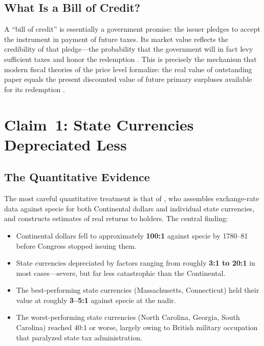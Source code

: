 \documentclass[12pt]{article}
\begin{document}
\subsection{What Is a Bill of Credit?}

A ``bill of credit'' is essentially a government promise: the issuer pledges
to accept the instrument in payment of future taxes.  Its market value
reflects the credibility of that pledge---the probability that the government
will in fact levy sufficient taxes and honor the redemption
\citep{Smith1985, Grubb2016}.  This is precisely the mechanism that modern
fiscal theories of the price level formalize: the real value of outstanding
paper equals the present discounted value of future primary surpluses
available for its redemption \citep{Perkins1994}.

\section{Claim~1: State Currencies Depreciated Less}

\subsection{The Quantitative Evidence}

The most careful quantitative treatment is that of \citet{Grubb2008,Grubb2012},
who assembles exchange-rate data against specie for both Continental dollars
and individual state currencies, and constructs estimates of real returns
to holders.  The central finding:

\begin{itemize}
  \item Continental dollars fell to approximately \textbf{100:1} against specie
    by 1780--81 before Congress stopped issuing them.
  \item State currencies depreciated by factors ranging from roughly \textbf{3:1
    to 20:1} in most cases---severe, but far less catastrophic than the
    Continental.
  \item The best-performing state currencies (Massachusetts, Connecticut) held
    their value at roughly \textbf{3--5:1} against specie at the nadir.
  \item The worst-performing state currencies (North Carolina, Georgia, South
    Carolina) reached 40:1 or worse, largely owing to British military
    occupation that paralyzed state tax administration.
\end{itemize}
\end{document}
